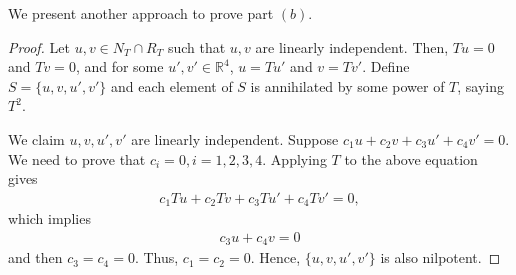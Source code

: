 \documentclass[11pt]{article}
\theoremstyle{definition}
\numberwithin{equation}{subsection}
\begin{document}
We present another approach to prove part $(b)$.
\begin{proof}
Let $u,v \in N_T \cap R_T$ such that $u, v$ are linearly independent. Then, $Tu = 0$ and $Tv = 0$, and for some $u', v' \in \mathbb{R}^4$, $u = Tu'$ and $v = Tv'$. Define $S = \{u, v, u', v'\}$ and each element of $S$ is annihilated by some power of $T$, saying $T^2$. 

We claim $u, v, u', v'$ are linearly independent. Suppose $c_1 u + c_2 v + c_3 u' + c_4 v' = 0$. We need to prove that $c_i = 0, i = 1,2,3,4$. Applying $T$ to the above equation gives
\begin{align*}
    c_1 T u + c_2 T v + c_3 T u' + c_4 T v' = 0,
\end{align*}
which implies
\begin{align*}
    c_3 u + c_4 v = 0
\end{align*}
and then $c_3 = c_4 = 0$. Thus, $c_1 = c_2 = 0$. Hence, $\{u, v, u', v'\}$ is also nilpotent.
\end{proof}

\medskip
\end{document}
